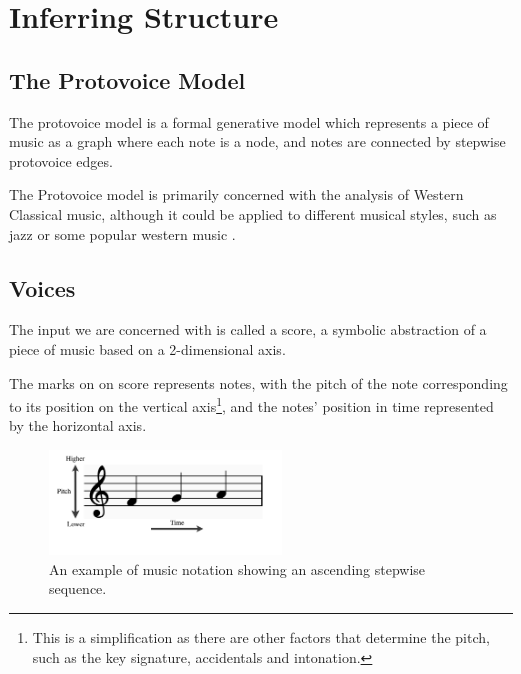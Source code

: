 \documentclass[12pt,a4paper,twoside,openright]{report}
\DeclareMathOperator*{\argmax}{arg\,max}
\theoremstyle{definition}
\begin{document}

\FloatBarrier
\section{Inferring Structure}
\subsection{The Protovoice Model}
The protovoice model is a formal generative model which represents a piece of music as a graph where each note is a node, and notes are connected by stepwise protovoice edges. 

The Protovoice model is primarily concerned with the analysis of Western Classical music, although it could be applied to different musical styles, such as jazz or some popular western music \cite{finkensiepStructureFreePolyphony2023}. 

\subsection{Voices}
The input we are concerned with is called a score, a symbolic abstraction of a piece of music based on a 2-dimensional axis.

The marks on on score represents notes, with the pitch of the note corresponding to its position on the vertical axis\footnote{This is a simplification as there are other factors that determine the pitch, such as the key signature, accidentals and intonation.}, and the notes' position in time represented by the horizontal axis.
\begin{figure}[h]
  \centering
  \includegraphics[width=0.55\textwidth]{prep/pitchTime.png}
  \captionsetup{width=.7\linewidth}
  \caption{An example of music notation showing an ascending stepwise sequence.}
  \label{fig:pitchTime}
\end{figure}
\end{document}
